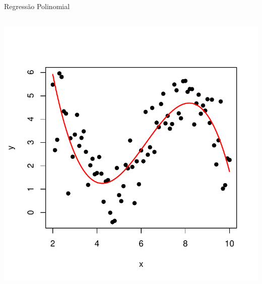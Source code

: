 \documentclass{beamer}\usepackage[]{graphicx}\usepackage[]{color}
\newenvironment{knitrout}{}{} %
\renewenvironment{knitrout}{\setlength{\topsep}{0mm}}{}
\begin{document}
\begin{frame}[fragile]{Regressão Polinomial}
\begin{columns}
\begin{knitrout}
\color{fgcolor}
\includegraphics[width=1\linewidth]{figure/samppol3plot-1} 

\end{knitrout}


\end{columns}

\end{frame}
\end{document}

